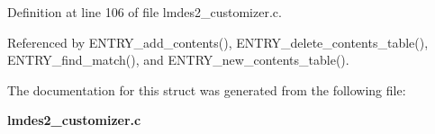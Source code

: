 Definition at line 106 of file lmdes2\_\-customizer.c.

Referenced by ENTRY\_\-add\_\-contents(), ENTRY\_\-delete\_\-contents\_\-table(), ENTRY\_\-find\_\-match(), and ENTRY\_\-new\_\-contents\_\-table().

The documentation for this struct was generated from the following file:\begin{CompactItemize}
\item 
\bf{lmdes2\_\-customizer.c}\end{CompactItemize}
